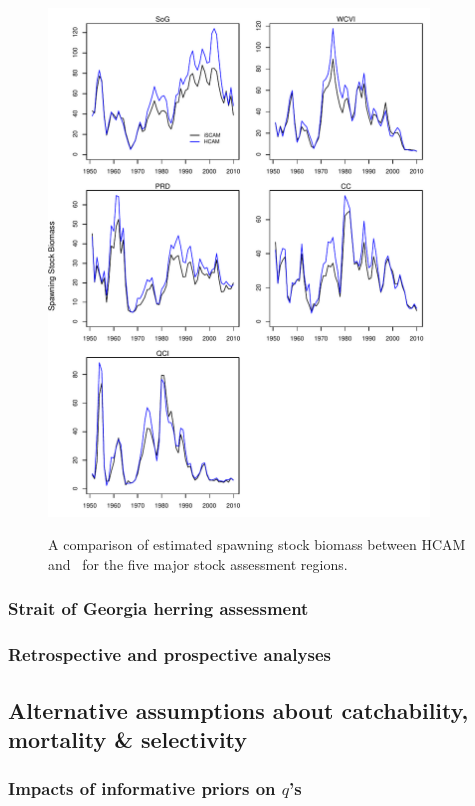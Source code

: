 \begin{figure}[!tbp]
	\includegraphics[width=0.9\textwidth]{../Figs/figHCAMvsiSCAM.pdf}\\
	\caption{A comparison of estimated spawning stock biomass between HCAM and \iscam\ for the five major stock assessment regions.}\label{figHCAMvsiSCAM}
\end{figure}


		\subsubsection{Strait of Georgia herring assessment}
		\subsubsection{Retrospective and prospective analyses}
	\subsection{Alternative assumptions about catchability, mortality \& selectivity}
		\subsubsection{Impacts of informative priors on $q$'s}
